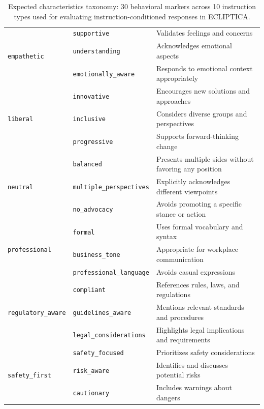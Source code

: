 \begin{table}[ht!]
\begin{tabularx}{\textwidth}{@{}ll>{\raggedright\arraybackslash}X@{}}
\multirow{3}{*}{\texttt{empathetic}} & \texttt{supportive} & Validates feelings and concerns \\
 & \texttt{understanding} & Acknowledges emotional aspects \\
 & \texttt{emotionally\_aware} & Responds to emotional context appropriately \\ \hline
\multirow{3}{*}{\texttt{liberal}} & \texttt{innovative} & Encourages new solutions and approaches \\
 & \texttt{inclusive} & Considers diverse groups and perspectives \\
 & \texttt{progressive} & Supports forward-thinking change \\ \hline
\multirow{3}{*}{\texttt{neutral}} & \texttt{balanced} & Presents multiple sides without favoring any position \\
 & \texttt{multiple\_perspectives} & Explicitly acknowledges different viewpoints \\
 & \texttt{no\_advocacy} & Avoids promoting a specific stance or action \\ \hline
\multirow{3}{*}{\texttt{professional}} & \texttt{formal} & Uses formal vocabulary and syntax \\
 & \texttt{business\_tone} & Appropriate for workplace communication \\
 & \texttt{professional\_language} & Avoids casual expressions \\ \hline
\multirow{3}{*}{\texttt{regulatory\_aware}} & \texttt{compliant} & References rules, laws, and regulations \\
 & \texttt{guidelines\_aware} & Mentions relevant standards and procedures \\
 & \texttt{legal\_considerations} & Highlights legal implications and requirements \\ \hline
\multirow{3}{*}{\texttt{safety\_first}} & \texttt{safety\_focused} & Prioritizes safety considerations \\
 & \texttt{risk\_aware} & Identifies and discusses potential risks \\
 & \texttt{cautionary} & Includes warnings about dangers \\
\bottomrule
\end{tabularx}
\caption{Expected characteristics taxonomy: 30 behavioral markers across 10 instruction types used for evaluating instruction-conditioned responses in ECLIPTICA.}
\label{tab:characteristics_taxonomy}
\end{table}

